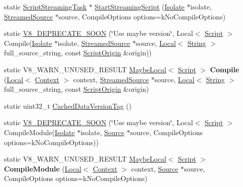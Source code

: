 \begin{DoxyCompactItemize}
\item 
static \hyperlink{classv8_1_1ScriptCompiler_1_1ScriptStreamingTask}{Script\+Streaming\+Task} $\ast$ \hyperlink{classv8_1_1ScriptCompiler_a406bb44ef02d644d94bccd3f7b04f2d4}{Start\+Streaming\+Script} (\hyperlink{classv8_1_1Isolate}{Isolate} $\ast$isolate, \hyperlink{classv8_1_1ScriptCompiler_1_1StreamedSource}{Streamed\+Source} $\ast$source, Compile\+Options options=k\+No\+Compile\+Options)
\item 
static \hyperlink{classv8_1_1ScriptCompiler_a4028f350cd69a0a0e8ae81b66b8b5ef3}{V8\+\_\+\+D\+E\+P\+R\+E\+C\+A\+T\+E\+\_\+\+S\+O\+O\+N} (\char`\"{}Use maybe version\char`\"{}, Local$<$ \hyperlink{classv8_1_1Script}{Script} $>$ Compile(\hyperlink{classv8_1_1Isolate}{Isolate} $\ast$isolate, \hyperlink{classv8_1_1ScriptCompiler_1_1StreamedSource}{Streamed\+Source} $\ast$source, \hyperlink{classv8_1_1Local}{Local}$<$ \hyperlink{classv8_1_1String}{String} $>$ full\+\_\+source\+\_\+string, const \hyperlink{classv8_1_1ScriptOrigin}{Script\+Origin} \&origin))
\item 
\hypertarget{classv8_1_1ScriptCompiler_a2381d1572e778efee274caaaaa765e0c}{}static V8\+\_\+\+W\+A\+R\+N\+\_\+\+U\+N\+U\+S\+E\+D\+\_\+\+R\+E\+S\+U\+L\+T \hyperlink{classv8_1_1MaybeLocal}{Maybe\+Local}$<$ \hyperlink{classv8_1_1Script}{Script} $>$ {\bfseries Compile} (\hyperlink{classv8_1_1Local}{Local}$<$ \hyperlink{classv8_1_1Context}{Context} $>$ context, \hyperlink{classv8_1_1ScriptCompiler_1_1StreamedSource}{Streamed\+Source} $\ast$source, \hyperlink{classv8_1_1Local}{Local}$<$ \hyperlink{classv8_1_1String}{String} $>$ full\+\_\+source\+\_\+string, const \hyperlink{classv8_1_1ScriptOrigin}{Script\+Origin} \&origin)\label{classv8_1_1ScriptCompiler_a2381d1572e778efee274caaaaa765e0c}

\item 
static uint32\+\_\+t \hyperlink{classv8_1_1ScriptCompiler_aea78877b0dccde1e587ee1ddeda1c155}{Cached\+Data\+Version\+Tag} ()
\item 
static \hyperlink{classv8_1_1ScriptCompiler_a08429ae707662767137f56e488f211b0}{V8\+\_\+\+D\+E\+P\+R\+E\+C\+A\+T\+E\+\_\+\+S\+O\+O\+N} (\char`\"{}Use maybe version\char`\"{}, Local$<$ \hyperlink{classv8_1_1Script}{Script} $>$ Compile\+Module(\hyperlink{classv8_1_1Isolate}{Isolate} $\ast$isolate, \hyperlink{classv8_1_1ScriptCompiler_1_1Source}{Source} $\ast$source, Compile\+Options options=k\+No\+Compile\+Options))
\item 
\hypertarget{classv8_1_1ScriptCompiler_a42373c4d7c20048db0dd9482410d48d6}{}static V8\+\_\+\+W\+A\+R\+N\+\_\+\+U\+N\+U\+S\+E\+D\+\_\+\+R\+E\+S\+U\+L\+T \hyperlink{classv8_1_1MaybeLocal}{Maybe\+Local}$<$ \hyperlink{classv8_1_1Script}{Script} $>$ {\bfseries Compile\+Module} (\hyperlink{classv8_1_1Local}{Local}$<$ \hyperlink{classv8_1_1Context}{Context} $>$ context, \hyperlink{classv8_1_1ScriptCompiler_1_1Source}{Source} $\ast$source, Compile\+Options options=k\+No\+Compile\+Options)\label{classv8_1_1ScriptCompiler_a42373c4d7c20048db0dd9482410d48d6}


\end{DoxyCompactItemize}
